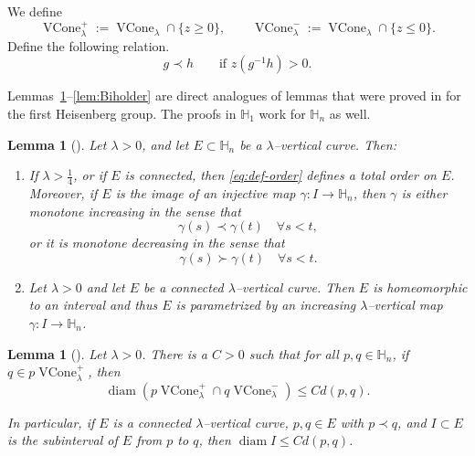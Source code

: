 \documentclass[12pt,reqno]{amsart}
\newcommand{\HH}{\mathbb{H}}
\newcommand{\from}{\colon}
\newtheorem{lemma}[thm]{Lemma}
\theoremstyle{remark}
\newcommand{\0}{\mathbf{0}}
\renewcommand{\1}{\mathbf 1}
\DeclareMathOperator{\VCone}{VCone}
\DeclareMathOperator{\diam}{diam}
\begin{document}
We define
\[
\VCone_\lambda^+ :=\VCone_\lambda\cap\{z\geq 0\}, \qquad \VCone_\lambda^- :=\VCone_\lambda\cap\{z\leq 0\}.
\]
Define the following relation.
\begin{equation}\label{eq:def-order}
    g \prec h \qquad \text{if $z(g^{-1}h) > 0$}.
\end{equation}

Lemmas~\ref{lem:vertical-properties}--\ref{lem:Biholder} are direct analogues of lemmas that were proved in \cite{AY-Vertical} for the first Heisenberg group. The proofs in $\HH_1$ work for $\HH_n$ as well.

\begin{lemma}[{\cite[Lemma 3.1(3) \& Proposition 3.2]{AY-Vertical}}]\label{lem:vertical-properties}
 Let $\lambda>0$, and let $E\subset \HH_n$ be a $\lambda$--vertical curve. Then:
  \begin{enumerate}
  \item\label{Item3} If $\lambda > \frac{1}{4}$, or if $E$ is connected, then \eqref{eq:def-order} defines a total order on $E$. Moreover, if $E$ is the image of an injective map $\gamma\from I\to\HH_n $, then $\gamma$ is either monotone increasing in the sense that
  \begin{equation}\label{eqn:First}
  \gamma(s) \prec \gamma(t) \quad \forall s<t,
  \end{equation}
  or it is monotone decreasing in the sense that
  \begin{equation}\label{eqn:Second}
  \gamma(s) \succ \gamma(t) \quad \forall s<t.
  \end{equation}
  \item  Let $\lambda>0$ and let $E$ be a connected $\lambda$--vertical curve. Then $E$ is homeomorphic to an interval and thus $E$ is parametrized by an increasing $\lambda$--vertical map $\gamma\from I \to\HH_n$.
\end{enumerate}
\end{lemma}

\begin{lemma}[{\cite[Lemma 3.3]{AY-Vertical}}]

\label{lem:compact-intersections-v2}
  Let $\lambda>0$. There is a $C>0$ such that for all $p,q\in \HH_n$, if $q\in p\VCone_\lambda^+$, then
  $$\diam\left(p\VCone_\lambda^+\cap q \VCone_\lambda^-\right)\le C d(p,q).$$
  
  In particular, if $E$ is a connected $\lambda$--vertical curve, $p,q\in E$ with $p\prec q$, and $I\subset E$ is the subinterval of $E$ from $p$ to $q$, then $\diam I\le C d(p,q)$. 
\end{lemma}
\end{document}
